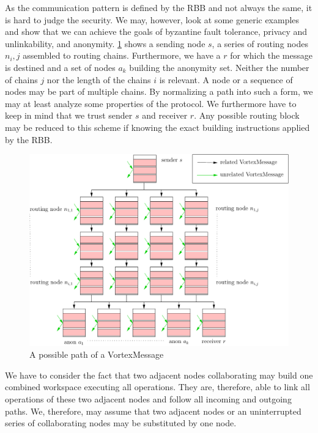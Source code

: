As the communication pattern is defined by the RBB and not always the same, it is hard to judge the security. We may, however, look at some generic examples and show that we can achieve the goals of byzantine fault tolerance, privacy and unlinkability, and anonymity. \cref{fig:messagePaths} shows a sending node $s$, a series of routing nodes $n_i,j$ assembled to routing chains. Furthermore, we have a $r$ for which the message is destined and a set of nodes $a_k$ building the anonymity set. Neither the number of chains $j$ nor the length of the chains $i$ is relevant. A node or a sequence of nodes may be part of multiple chains. By normalizing a path into such a form, we may at least analyze some properties of the protocol. We furthermore have to keep in mind that we trust sender $s$ and receiver $r$. Any possible routing block may be reduced to this scheme if knowing the exact building instructions applied by the RBB.

\begin{figure}[ht]
	\centering\includegraphics[width=0.7\columnwidth]{inc/messagePaths}
	\caption{A possible path of a VortexMessage}
	\label{fig:messagePaths}
\end{figure}

We have to consider the fact that two adjacent nodes collaborating may build one combined workspace executing all operations. They are, therefore, able to link all operations of these two adjacent nodes and follow all incoming and outgoing paths. We, therefore, may assume that two adjacent nodes or an uninterrupted series of collaborating nodes may be substituted by one node.

